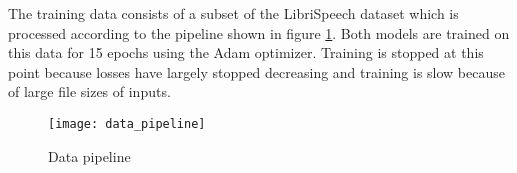 The training data consists of a subset of the LibriSpeech dataset \cite{panayotov_librispeech_2015} which is processed according to the pipeline shown in figure \ref{fig:data_pipeline}. Both models are trained on this data for 15 epochs using the Adam optimizer. Training is stopped at this point because losses have largely stopped decreasing and training is slow because of large file sizes of inputs.

\begin{figure}[h]
	\centering
	\texttt{[image: data\_pipeline]}
	\caption{Data pipeline}
	\label{fig:data_pipeline}
\end{figure}
